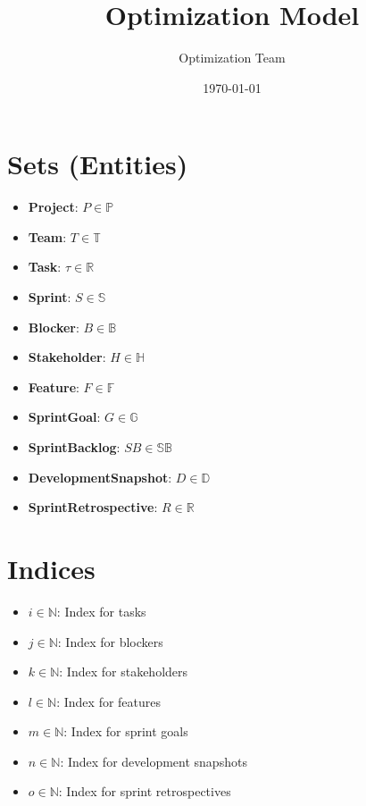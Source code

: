 \documentclass{article}
\title{Optimization Model}
\author{Optimization Team}
\date{\today}
\begin{document}
\maketitle
\tableofcontents
\section{Sets (Entities)}
\begin{itemize}
    \item \textbf{Project}: $ P \in \mathbb{P} $
    \item \textbf{Team}: $ T \in \mathbb{T} $
    \item \textbf{Task}: $ \tau \in \mathbb{R} $
    \item \textbf{Sprint}: $ S \in \mathbb{S} $
    \item \textbf{Blocker}: $ B \in \mathbb{B} $
    \item \textbf{Stakeholder}: $ H \in \mathbb{H} $
    \item \textbf{Feature}: $ F \in \mathbb{F} $
    \item \textbf{SprintGoal}: $ G \in \mathbb{G} $
    \item \textbf{SprintBacklog}: $ SB \in \mathbb{SB} $
    \item \textbf{DevelopmentSnapshot}: $ D \in \mathbb{D} $
    \item \textbf{SprintRetrospective}: $ R \in \mathbb{R} $
\end{itemize}
\section{Indices}
\begin{itemize}
    \item $ i \in \mathbb{N} $: Index for tasks
    \item $ j \in \mathbb{N} $: Index for blockers
    \item $ k \in \mathbb{N} $: Index for stakeholders
    \item $ l \in \mathbb{N} $: Index for features
    \item $ m \in \mathbb{N} $: Index for sprint goals
    \item $ n \in \mathbb{N} $: Index for development snapshots
    \item $ o \in \mathbb{N} $: Index for sprint retrospectives
\end{itemize}
\end{document}
